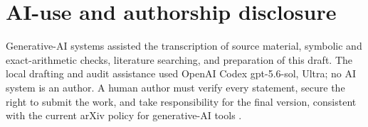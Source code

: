 \section*{AI-use and authorship disclosure}

Generative-AI systems assisted the transcription of source material, symbolic
and exact-arithmetic checks, literature searching, and preparation of this
draft.  The local drafting and audit assistance used OpenAI Codex gpt-5.6-sol,
Ultra; no AI system is an author.  A human author must verify every statement,
secure the right to submit the work, and take responsibility for the final
version, consistent with the current arXiv policy for generative-AI tools
\cite{arXivModeration}.





